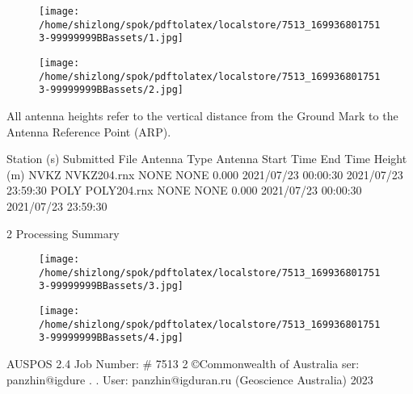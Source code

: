 \documentclass[a4paper,12pt]{article}
\begin{document}
\begin{figure}[h]

\texttt{[image: /home/shizlong/spok/pdftolatex/localstore/7513\_1699368017513-99999999BBassets/1.jpg]}

\centering

\end{figure}

\begin{figure}[h]

\texttt{[image: /home/shizlong/spok/pdftolatex/localstore/7513\_1699368017513-99999999BBassets/2.jpg]}

\centering

\end{figure}

    All antenna heights refer to the vertical distance from the Ground Mark to the Antenna  Reference Point (ARP). 

\vspace{10pt}

                   Station (s) Submitted File Antenna Type Antenna Start Time End Time   Height (m)  NVKZ NVKZ204.rnx NONE NONE 0.000 2021/07/23 00:00:30 2021/07/23 23:59:30  POLY POLY204.rnx NONE NONE 0.000 2021/07/23 00:00:30 2021/07/23 23:59:30                                   

\vspace{10pt}

    2 Processing Summary 

\vspace{10pt}

\begin{figure}[h]

\texttt{[image: /home/shizlong/spok/pdftolatex/localstore/7513\_1699368017513-99999999BBassets/3.jpg]}

\centering

\end{figure}

\begin{figure}[h]

\texttt{[image: /home/shizlong/spok/pdftolatex/localstore/7513\_1699368017513-99999999BBassets/4.jpg]}

\centering

\end{figure}

         AUSPOS 2.4 Job Number: \# 7513 2 ©Commonwealth of Australia    ser: panzhin@igdure . .  User: panzhin@igduran.ru (Geoscience Australia) 2023 
\end{document}
